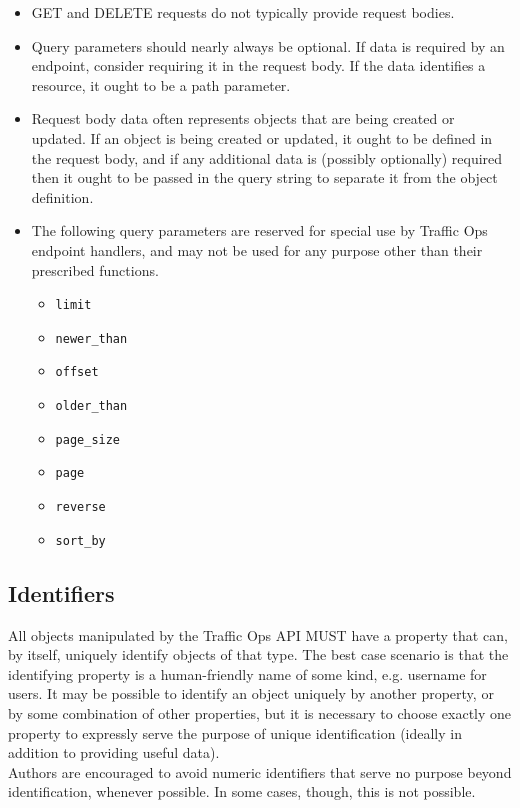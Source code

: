 \documentclass{article}
\newcommand{\code}[1]{\texttt{\color{inlinecodecolor}#1}}
\begin{document}
\begin{itemize}
	\item GET and DELETE requests do not typically provide request bodies.
	\item Query parameters should nearly always be optional. If data is required by an endpoint, consider requiring it in the request body. If the data identifies a resource, it ought to be a path parameter.
	\item Request body data often represents objects that are being created or updated. If an object is being created or updated, it ought to be defined in the
	request body, and if any additional data is (possibly optionally) required then it ought to be passed in the query string to separate it from the object definition.
	\item The following query parameters are reserved for special use by Traffic Ops endpoint handlers, and may not be used for any purpose other
	than their prescribed functions.
	\begin{itemize}
		\item \code{limit}
		\item \code{newer\_than}
		\item \code{offset}
		\item \code{older\_than}
		\item \code{page\_size}
		\item \code{page}
		\item \code{reverse}
		\item \code{sort\_by}
	\end{itemize}
\end{itemize}

\subsection{Identifiers}
All objects manipulated by the Traffic Ops API MUST have a property that can, by itself, uniquely identify objects of that type. The best case
scenario is that the identifying property is a human-friendly name of some kind, e.g. username for users. It may be possible to identify an
object uniquely by another property, or by some combination of other properties, but it is necessary to choose exactly one property to expressly
serve the purpose of unique identification (ideally in addition to providing useful data).\\
Authors are encouraged to avoid numeric identifiers that serve no purpose beyond identification, whenever possible. In some cases, though, this
is not possible.
\end{document}

